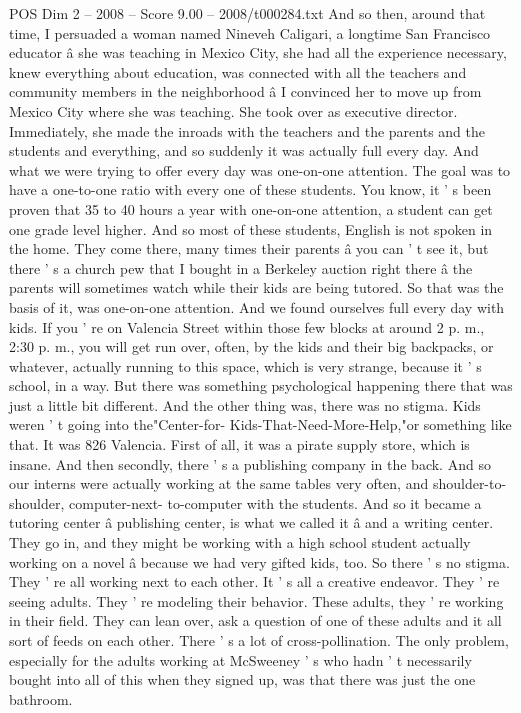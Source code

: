 \begin{textsample}{POS Dim 2 – 2008 – Score 9.00 – 2008/t000284.txt}
And so then, around that time, I persuaded a woman named Nineveh Caligari, a longtime San Francisco educator â she was teaching in Mexico City, she had all the experience necessary, knew everything about education, was connected with all the teachers and community members in the neighborhood â I convinced her to move up from Mexico City where she was teaching.
She took over as executive director.
Immediately, she made the inroads with the teachers and the parents and the students and everything, and so suddenly it was actually full every day.
And what we were trying to offer every day was one-on-one attention.
The goal was to have a one-to-one ratio with every one of these students.
You know, it ' s been proven that 35 to 40 hours a year with one-on-one attention, a student can get one grade level higher.
And so most of these students, English is not spoken in the home.
They come there, many times their parents â you can ' t see it, but there ' s a church pew that I bought in a Berkeley auction right there â the parents will sometimes watch while their kids are being tutored.
So that was the basis of it, was one-on-one attention.
And we found ourselves full every day with kids.
If you ' re on Valencia Street within those few blocks at around 2 p. m., 2:30 p. m., you will get run over, often, by the kids and their big backpacks, or whatever, actually running to this space, which is very strange, because it ' s school, in a way.
But there was something psychological happening there that was just a little bit different.
And the other thing was, there was no stigma.
Kids weren ' t going into the"Center-for- Kids-That-Need-More-Help,"or something like that.
It was 826 Valencia.
First of all, it was a pirate supply store, which is insane.
And then secondly, there ' s a publishing company in the back.
And so our interns were actually working at the same tables very often, and shoulder-to-shoulder, computer-next- to-computer with the students.
And so it became a tutoring center â publishing center, is what we called it â and a writing center.
They go in, and they might be working with a high school student actually working on a novel â because we had very gifted kids, too.
So there ' s no stigma.
They ' re all working next to each other.
It ' s all a creative endeavor.
They ' re seeing adults.
They ' re modeling their behavior.
These adults, they ' re working in their field.
They can lean over, ask a question of one of these adults and it all sort of feeds on each other.
There ' s a lot of cross-pollination.
The only problem, especially for the adults working at McSweeney ' s who hadn ' t necessarily bought into all of this when they signed up, was that there was just the one bathroom.

\end{textsample}
